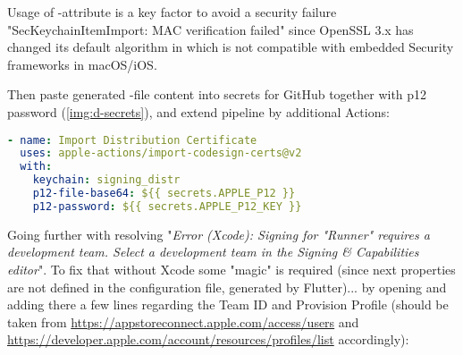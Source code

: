 \noindent Usage of -attribute is a key factor to avoid a security failure "SecKeychainItemImport: MAC 
verification failed" since OpenSSL 3.x has changed its default algorithm in  which is not compatible with 
embedded Security frameworks in macOS/iOS.

Then paste generated -file content into secrets for GitHub together with p12 password (\cref{img:d-secrets}), 
and extend pipeline by additional Actions:

\begin{lstlisting}[language=yaml]
- name: Import Distribution Certificate
  uses: apple-actions/import-codesign-certs@v2
  with: 
    keychain: signing_distr
    p12-file-base64: ${{ secrets.APPLE_P12 }}
    p12-password: ${{ secrets.APPLE_P12_KEY }}
\end{lstlisting}


\noindent Going further with resolving "\emph{Error (Xcode): Signing for "Runner" requires a development team. Select a 
development team in the Signing \& Capabilities editor}". To fix that without Xcode some "magic" is required (since 
next properties are not defined in the configuration file, generated by Flutter)... by opening 
 and adding there a few lines regarding the Team ID and Provision Profile 
(should be taken from \href{https://appstoreconnect.apple.com/access/users}{https://appstoreconnect.apple.com/access/users}
and \href{https://developer.apple.com/account/resources/profiles/list}{https://developer.apple.com/account/resources/profiles/list}
accordingly):\\
\\

